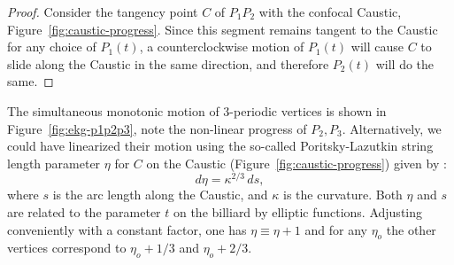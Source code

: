 \begin{proof}
Consider the tangency point $C$ of $P_1P_2$ with the confocal Caustic, Figure~\ref{fig:caustic-progress}. Since this segment remains tangent to the Caustic for any choice of $P_1(t)$, a counterclockwise motion of $P_1(t)$ will cause $C$ to slide along the Caustic in the same direction, and therefore $P_2(t)$ will do the same.
\end{proof}

The simultaneous monotonic motion of 3-periodic vertices is shown in Figure~\ref{fig:ekg-p1p2p3}, note the non-linear progress of $P_2,P_3$. Alternatively, we could have linearized their motion using the so-called Poritsky-Lazutkin string length parameter $\eta$ for $C$ on the Caustic (Figure~\ref{fig:caustic-progress}) given by \cite{Poritsky1950, Lazutkin73, alexey19}:
%
$$
d\eta =  \kappa^{2/3}\,ds,
$$
%
\noindent where  $s$ is the arc length along the Caustic, and $\kappa$ is the curvature. 
Both $\eta$ and $s$ are related to the parameter $t$ on the billiard by elliptic functions. Adjusting conveniently with a constant factor, one has $\eta\equiv\eta+1$ and for any $\eta_o$ the other vertices correspond to  $\eta_o+1/3$ and $\eta_o+2/3$.

